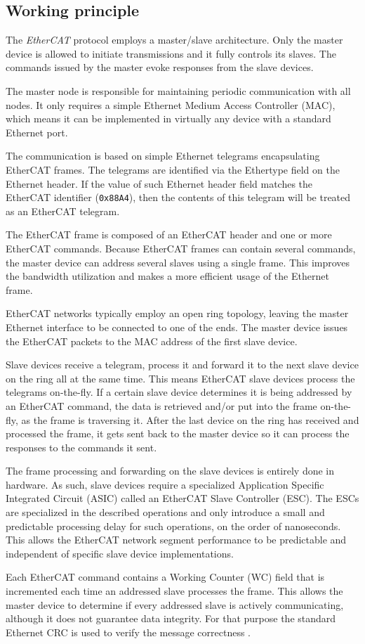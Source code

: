 \subsection{Working principle} \label{subsec:ecat_principle}

The \emph{EtherCAT} protocol employs a master/slave architecture.
Only the master device is allowed to initiate transmissions and it fully controls its slaves.
The commands issued by the master evoke responses from the slave devices.

The master node is responsible for maintaining periodic communication with all nodes.
It only requires a simple Ethernet Medium Access Controller (MAC), which means it can be implemented in virtually any device with a standard Ethernet port.

The communication is based on simple Ethernet telegrams encapsulating EtherCAT frames.
The telegrams are identified via the Ethertype field on the Ethernet header.
If the value of such Ethernet header field matches the EtherCAT identifier (\verb|0x88A4|), then the contents of this telegram will be treated as an EtherCAT telegram.

The EtherCAT frame is composed of an EtherCAT header and one or more EtherCAT commands.
Because EtherCAT frames can contain several commands, the master device can address several slaves using a single frame.
This improves the bandwidth utilization and makes a more efficient usage of the Ethernet frame.

EtherCAT networks typically employ an open ring topology, leaving the master Ethernet interface to be connected to one of the ends.
The master device issues the EtherCAT packets to the MAC address of the first slave device.

Slave devices receive a telegram, process it and forward it to the next slave device on the ring all at the same time.
This means EtherCAT slave devices process the telegrams on-the-fly.
If a certain slave device determines it is being addressed by an EtherCAT command, the data is retrieved and/or put into the frame on-the-fly, as the frame is traversing it.
After the last device on the ring has received and processed the frame, it gets sent back to the master device so it can process the responses to the commands it sent.

The frame processing and forwarding on the slave devices is entirely done in hardware.
As such, slave devices require a specialized Application Specific Integrated Circuit (ASIC) called an EtherCAT Slave Controller (ESC).
The ESCs are specialized in the described operations and only introduce a small and predictable processing delay for such operations, on the order of nanoseconds.
This allows the EtherCAT network segment performance to be predictable and independent of specific slave device implementations.

Each EtherCAT command contains a Working Counter (WC) field that is incremented each time an addressed slave processes the frame.
This allows the master device to determine if every addressed slave is actively communicating, although it does not guarantee data integrity.
For that purpose the standard Ethernet CRC is used to verify the message correctness \cite{technology:rte2}.
